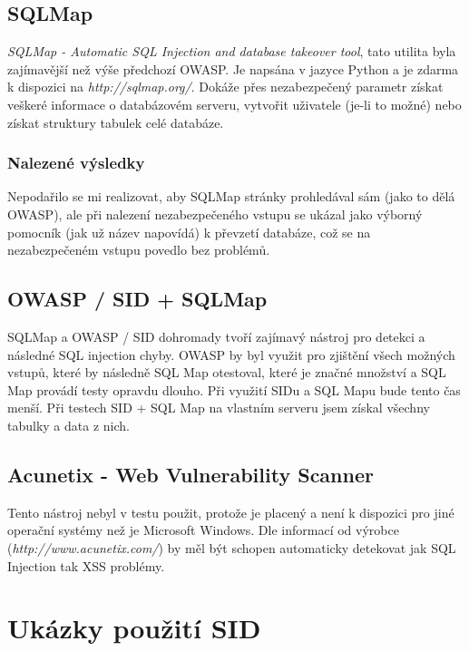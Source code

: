 \section{SQLMap}
\textit{SQLMap - Automatic SQL Injection and database takeover tool}, tato utilita byla zajímavější než výše předchozí OWASP. Je napsána v jazyce Python a je zdarma k dispozici na \textit{http://sqlmap.org/}. Dokáže přes nezabezpečený parametr získat veškeré informace o databázovém serveru, vytvořit uživatele (je-li to možné) nebo získat struktury tabulek celé databáze.

\subsection{Nalezené výsledky}
Nepodařilo se mi realizovat, aby SQLMap stránky prohledával sám (jako to dělá OWASP), ale při nalezení nezabezpečeného vstupu se ukázal jako výborný pomocník (jak už název napovídá) k převzetí databáze, což se na nezabezpečeném vstupu povedlo bez problémů.

\section{OWASP / SID + SQLMap}
SQLMap a OWASP / SID dohromady tvoří zajímavý nástroj pro detekci a následné  SQL injection chyby. OWASP by byl využit pro zjištění všech možných vstupů, které by následně SQL Map otestoval, které je značné množství a SQL Map provádí testy opravdu dlouho. Při využití SIDu a SQL Mapu bude tento čas menší. Při testech SID + SQL Map na vlastním serveru jsem získal všechny tabulky a data z nich.

\section{Acunetix - Web Vulnerability Scanner}
Tento nástroj nebyl v testu použit, protože je placený a není k dispozici pro jiné operační systémy než je Microsoft Windows. Dle informací od výrobce (\textit{http://www.acunetix.com/}) by měl být schopen automaticky detekovat jak SQL Injection tak XSS problémy.


\chapter{Ukázky použití SID}
